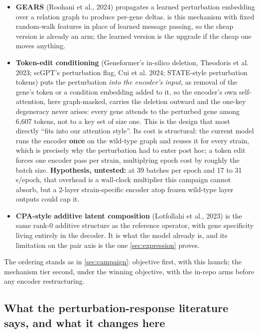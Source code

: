 \begin{itemize}
\item \textbf{GEARS} (Roohani et al., 2024) propagates a learned perturbation embedding
  over a relation graph to produce per-gene deltas.  is
  this mechanism with fixed random-walk features in place of learned message passing, so
  the cheap version is already an arm; the learned version is the upgrade if the cheap one
  moves anything.
\item \textbf{Token-edit conditioning} (Geneformer's in-silico deletion, Theodoris et al.
  2023; scGPT's perturbation flag, Cui et al. 2024; STATE-style perturbation tokens) puts
  the perturbation \emph{into the encoder's input}, as removal of the gene's token or a
  condition embedding added to it, so the encoder's own self-attention, here graph-masked,
  carries the deletion outward and the one-key degeneracy never arises: every gene attends
  to the perturbed gene among 6,607 tokens, not to a key set of size one. This is the
  design that most directly ``fits into our attention style''. Its cost is structural: the
  current model runs the encoder \textbf{once} on the wild-type graph and reuses it for
  every strain, which is precisely why the perturbation had to enter post hoc; a token
  edit forces one encoder pass per strain, multiplying epoch cost by roughly the batch
  size. \textbf{Hypothesis, untested:} at 39 batches per epoch and 17 to 31 s/epoch, that
  overhead is a wall-clock multiplier this campaign cannot absorb, but a 2-layer
  strain-specific encoder atop frozen wild-type layer outputs could cap it.
\item \textbf{CPA-style additive latent composition} (Lotfollahi et al., 2023) is the same
  rank-0 additive structure as the reference operator, with gene specificity living
  entirely in the decoder. It is what the model already is, and its limitation on the pair
  axis is the one \cref{sec:expression} proves.
\end{itemize}

The ordering stands as in \cref{sec:campaign}: objective first, with this launch; the
mechanism tier second, under the winning objective, with the in-repo arms before any
encoder restructuring.

\subsection{What the perturbation-response literature says, and what it changes here
}
\label{sec:related}

